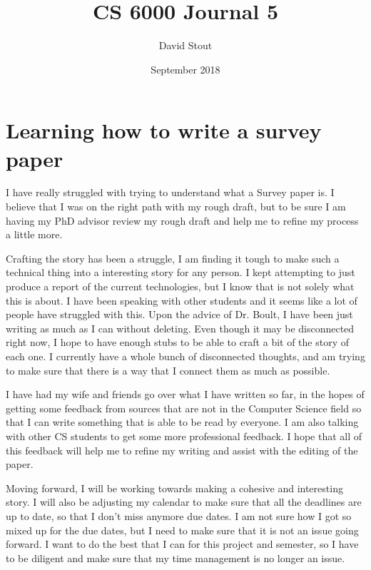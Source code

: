 \documentclass{article}
\title{CS 6000 Journal 5}
\author{David Stout}
\date{September 2018}
\begin{document}
\maketitle

\section{Learning how to write a survey paper}
I have really struggled with trying to understand what a Survey paper is. I believe that I was on the right path with my rough draft, but to be sure I am having my PhD advisor review my rough draft and help me to refine my process a little more. 

Crafting the story has been a struggle, I am finding it tough to make such a technical thing into a interesting story for any person. I kept attempting to just produce a report of the current technologies, but I know that is not solely what this is about. I have been speaking with other students and it seems like a lot of people have struggled with this. Upon the advice of Dr. Boult, I have been just writing as much as I can without deleting. Even though it may be disconnected right now, I hope to have enough stubs to be able to craft a bit of the story of each one. I currently have a whole bunch of disconnected thoughts, and am trying to make sure that there is a way that I connect them as much as possible.

I have had my wife and friends go over what I have written so far, in the hopes of getting some feedback from sources that are not in the Computer Science field so that I can write something that is able to be read by everyone. I am also talking with other CS students to get some more professional feedback. I hope that all of this feedback will help me to refine my writing and assist with the editing of the paper. 

Moving forward, I will be working towards making a cohesive and interesting story. I will also be adjusting my calendar to make sure that all the deadlines are up to date, so that I don't miss anymore due dates. I am not sure how I got so mixed up for the due dates, but I need to make sure that it is not an issue going forward. I want to do the best that I can for this project and semester, so I have to be diligent and make sure that my time management is no longer an issue. 
\end{document}
